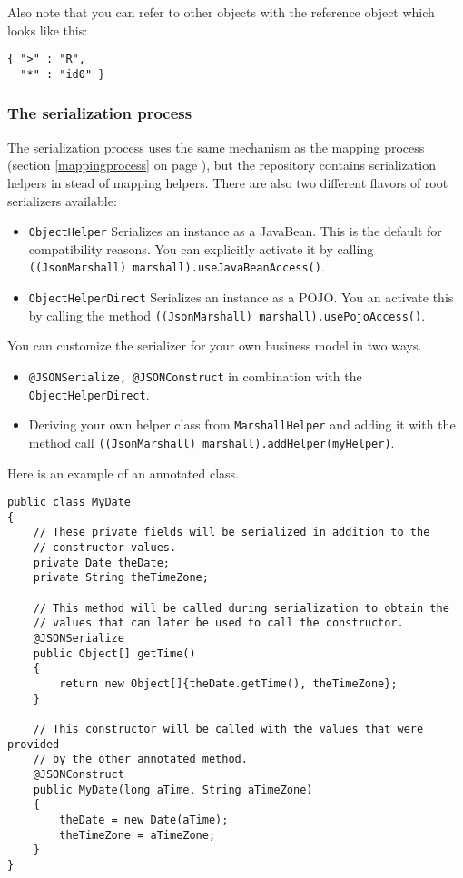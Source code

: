 \documentclass[a4paper]{article}
\begin{document}
Also note that you can refer to other objects with the reference object which looks like this:

\medskip
\begin{lstlisting}
{ ">" : "R",
  "*" : "id0" }
\end{lstlisting}
\medskip

\subsubsection{The serialization process}
\label{serializationprocess}

The serialization process uses the same mechanism as the mapping process (section \ref{mappingprocess} on page \pageref{mappingprocess}), but the repository contains serialization helpers in stead of mapping helpers. There are also two different flavors of root serializers available:

\begin{itemize}
   \item \lstinline{ObjectHelper} Serializes an instance as a JavaBean. This is the default for compatibility reasons. You can explicitly activate it by calling \lstinline{((JsonMarshall) marshall).useJavaBeanAccess()}.
   \item \lstinline{ObjectHelperDirect} Serializes an instance as a POJO. You an activate this by calling the method \lstinline{((JsonMarshall) marshall).usePojoAccess()}.
\end{itemize}

You can customize the serializer for your own business model in two ways.

\begin{itemize}
   \item \lstinline{@JSONSerialize, @JSONConstruct} in combination with the \lstinline{ObjectHelperDirect}.
   \item Deriving your own helper class from \lstinline{MarshallHelper} and adding it with the method call  \lstinline{((JsonMarshall) marshall).addHelper(myHelper)}.
\end{itemize}

Here is an example of an annotated class.

\begin{lstlisting}
public class MyDate
{
    // These private fields will be serialized in addition to the
    // constructor values.
    private Date theDate;
    private String theTimeZone;

    // This method will be called during serialization to obtain the
    // values that can later be used to call the constructor.
    @JSONSerialize
    public Object[] getTime()
    {
        return new Object[]{theDate.getTime(), theTimeZone};
    }
    
    // This constructor will be called with the values that were provided
    // by the other annotated method.
    @JSONConstruct
    public MyDate(long aTime, String aTimeZone)
    {
        theDate = new Date(aTime);
        theTimeZone = aTimeZone;
    }
}
\end{lstlisting}
\end{document}
